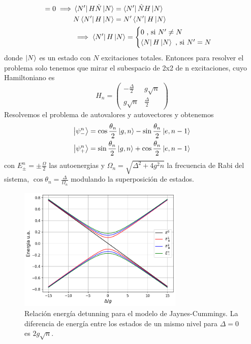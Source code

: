 \begin{align*}
    [H,\hat N]=0 \implies & \bra{N'}H \hat N \ket{N} = \bra{N'}\hat N H \ket{N} \\
    & N \bra{N'}H  \ket{N} = N' \bra{N'}H \ket{N} \\
    & \implies \bra{N'}H \ket{N} = \begin{cases}
        0 \text{ , si } N' \neq N \\
        \bra{N}H \ket{N} \text{ , si } N'=N
    \end{cases}
\end{align*}
donde $\ket{N}$ es un estado con $N$ excitaciones totales. Entonces para resolver el problema solo tenemos que mirar el subespacio de 2x2 de n excitaciones, cuyo Hamiltoniano es
\begin{equation}
    H_n=\begin{pmatrix}
        -\frac{\Delta}{2} & g \sqrt{n} \\
        g \sqrt{n} & \frac{\Delta}{2} 
    \end{pmatrix}
\end{equation}
Resolvemos el problema de autovalores y autovectores y obtenemos
\begin{equation}
    \begin{aligned}
        \ket{\psi^n_-} & = \cos \frac{\theta_n}{2}\ket{g,n}-\sin \frac{\theta_n}{2}\ket{e,n-1} \\
        \ket{\psi^n_+} & = \sin \frac{\theta_n}{2}\ket{g,n}+\cos \frac{\theta_n}{2}\ket{e,n-1}        
    \end{aligned}
\end{equation}
con $E_{\pm}^n=\pm \frac{\Omega}{2}$ las autoenergias y $\Omega_n=\sqrt{\Delta^2+4g^2n}$ la frecuencia de Rabi del sistema, $\cos \theta_n=\frac{\Delta}{\Omega_n}$ modulando la superposici\'on de estados. 
\begin{figure}
    \centering
    \includegraphics[width=0.7\textwidth]{figuras/ch3/relacion energia detunning jcm simple.png}
    \caption{Relaci\'on energ\'ia detunning para el modelo de Jaynes-Cummings. La diferencia de energ\'ia entre los estados de un mismo nivel para $\Delta=0$ es $2g\sqrt{n}$.}
    \label{fig:relación energia detunning jcm1}
\end{figure}
